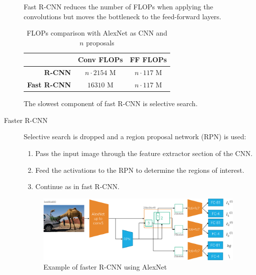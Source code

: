 \begin{description}
        \begin{remark}
            Fast R-CNN reduces the number of FLOPs when applying the convolutions but moves the bottleneck to the feed-forward layers.
            \begin{table}[H]
                \centering
                \footnotesize
                \begin{tabular}{rcc}
                    \toprule
                    & \textbf{Conv FLOPs} & \textbf{FF FLOPs} \\
                    \midrule
                    \textbf{R-CNN} & $n \cdot 2154$ M & $n \cdot 117$ M \\
                    \textbf{Fast R-CNN} & $\num{16310}$ M & $n \cdot 117$ M \\
                    \bottomrule
                \end{tabular}
                \caption{FLOPs comparison with AlexNet as CNN and $n$ proposals}
            \end{table}
        \end{remark}

        \begin{remark}
            The slowest component of fast R-CNN is selective search.
        \end{remark}

    \item[Faster R-CNN] 
        Selective search is dropped and a region proposal network (RPN) is used:
        \begin{enumerate}
            \item Pass the input image through the feature extractor section of the CNN.
            \item Feed the activations to the RPN to determine the regions of interest.
            \item Continue as in fast R-CNN.
        \end{enumerate}

        \begin{figure}[H]
            \centering
            \includegraphics[width=0.8\linewidth]{./img/_faster_r_cnn.pdf}
            \caption{Example of faster R-CNN using AlexNet}
        \end{figure}


\end{description}
